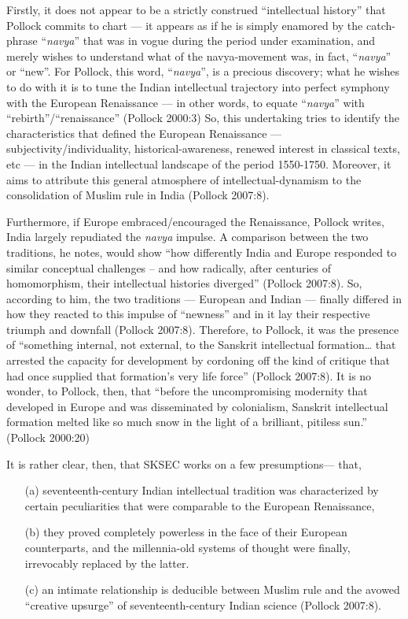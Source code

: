 Firstly, it does not appear to be a strictly construed “intellectual history” that Pollock commits to chart — it appears as if he is simply enamored by the catch-phrase “{\sl navya}” that was in vogue during the period under examination, and merely wishes to understand what of the navya-movement was, in fact, “{\sl navya}” or “new”. For Pollock, this word, “{\sl navya}”, is a precious discovery; what he wishes to do with it is to tune the Indian intellectual trajectory into perfect symphony with the European Renaissance — in other words, to equate “{\sl navya}” with “rebirth”/“renaissance” (Pollock 2000:3) So, this undertaking tries to identify the characteristics that defined the European Renaissance — subjectivity/individuality, historical-awareness, renewed interest in classical texts, etc — in the Indian intellectual landscape of the period 1550-1750. Moreover, it aims to attribute this general atmosphere of intellectual-dynamism to the consolidation of Muslim rule in India (Pollock 2007:8).

Furthermore, if Europe embraced/encouraged the Renaissance, Pollock writes, India largely repudiated the {\sl navya} impulse. A comparison between the two traditions, he notes, would show
“how differently India and Europe responded to similar conceptual challenges – and how radically, after centuries of homomorphism, their intellectual histories diverged” (Pollock 2007:8). So, according to him, the two traditions — European and Indian — finally differed in how they reacted to this impulse of “newness” and in it lay their respective triumph and downfall (Pollock 2007:8). Therefore, to Pollock, it was the presence of “something internal, not external, to the Sanskrit intellectual formation… that arrested the capacity for development by cordoning off the kind of critique that had once supplied that formation’s very life force” (Pollock 2007:8). It is no wonder, to Pollock, then, that “before the uncompromising modernity that developed in Europe and was disseminated by colonialism, Sanskrit intellectual formation melted like so much snow in the light of a brilliant, pitiless sun.” (Pollock 2000:20)

It is rather clear, then, that SKSEC works on a few presumptions— that, 
\begin{itemize}
\item[(a)] seventeenth-century Indian intellectual tradition was characterized by certain peculiarities that were comparable to the European Renaissance,

\item[(b)] they proved completely powerless in the face of their European counterparts, and the millennia-old systems of thought were finally, irrevocably replaced by the latter. 

\item[(c)] an intimate relationship is deducible between Muslim rule and the avowed “creative upsurge” of seventeenth-century Indian science (Pollock 2007:8).
\end{itemize}

